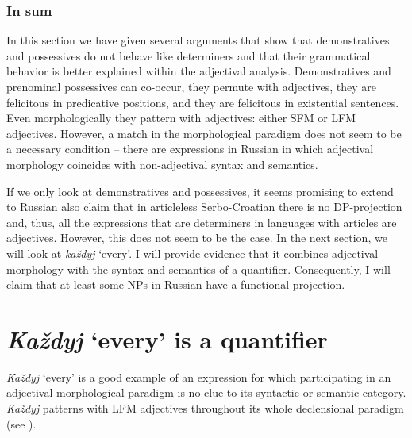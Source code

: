 \documentclass[output=paper]{langscibook}
\begin{document}
\subsubsection{In sum}

In this section we have given several arguments that show that demonstratives and possessives do not behave like determiners and that their grammatical behavior is better explained within the adjectival analysis. Demonstratives and prenominal possessives can co-occur, they permute with adjectives, they are felicitous in predicative positions, and they are felicitous in existential sentences. Even morphologically they pattern with adjectives: either SFM or LFM adjectives. However, a match in the morphological paradigm does not seem to be a necessary condition -- there are expressions in Russian in which adjectival morphology coincides with non-adjectival syntax and semantics.

If we only look at demonstratives and possessives, it seems promising to extend to Russian also   claim that in articleless Serbo-Croatian there is no DP-projection and, thus, all the expressions that are determiners in languages with articles are adjectives. 
However, this does not seem to be the case. In the next section, we will look at \textit{každyj} `every'. I will provide evidence that it combines adjectival morphology with the syntax and semantics of a quantifier. Consequently, I will claim that at least some NPs in Russian have a functional projection.
%
%
\section{\textit{Každyj} `every' is a quantifier}\label{sec:3_kazdyj}

\textit{Každyj} `every' is a good example of an expression for which participating in an adjectival morphological paradigm is no clue to its syntactic or semantic category. \textit{Každyj} patterns with LFM adjectives throughout its whole declensional paradigm (see ).
\end{document}
